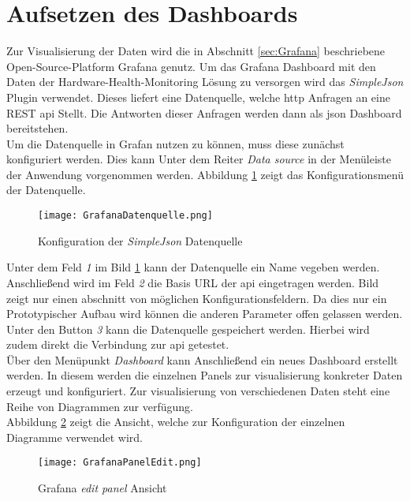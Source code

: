 \newpage
\section{Aufsetzen des Dashboards}
Zur Visualisierung der Daten wird die in Abschnitt \ref{sec:Grafana} beschriebene Open-Source-Platform Grafana genutz. Um das Grafana Dashboard mit den Daten der Hardware-Health-Monitoring Lösung zu versorgen wird das \textit{SimpleJson} Plugin verwendet. Dieses liefert eine Datenquelle, welche \ac{http} Anfragen an eine REST \ac{api} Stellt. Die Antworten dieser Anfragen werden dann als \ac{json} Dashboard bereitstehen.\\
Um die Datenquelle in Grafan nutzen zu können, muss diese zunächst konfiguriert werden. Dies kann Unter dem Reiter \textit{Data source} in der Menüleiste der Anwendung vorgenommen werden. Abbildung \ref{fig:SimpleJSONKonfig} zeigt das Konfigurationsmenü der Datenquelle. 
\begin{center}
    \begin{figure}[h!]
        \centering
        \texttt{[image: GrafanaDatenquelle.png]}
        \caption{Konfiguration der \textit{SimpleJson} Datenquelle}
        \label{fig:SimpleJSONKonfig}
    \end{figure}
\end{center}
Unter dem Feld \textit{1} im Bild \ref{fig:SimpleJSONKonfig} kann der Datenquelle ein Name vegeben werden. Anschließend wird im Feld \textit{2} die Basis URL der \ac{api} eingetragen werden. Bild zeigt nur einen abschnitt von möglichen Konfigurationsfeldern. Da dies nur ein Prototypischer Aufbau wird können die anderen Parameter offen gelassen werden. Unter den Button \textit{3} kann die Datenquelle gespeichert werden. Hierbei wird zudem direkt die Verbindung zur \ac{api} getestet.\\
Über den Menüpunkt \textit{Dashboard} kann Anschließend ein neues Dashboard erstellt werden. In diesem werden die einzelnen Panels zur visualisierung konkreter Daten erzeugt und konfiguriert. Zur visualisierung von verschiedenen Daten steht eine Reihe von Diagrammen zur verfügung.\\
Abbildung \ref{fig:PanelBearbeitung} zeigt die Ansicht, welche zur Konfiguration der einzelnen Diagramme verwendet wird.
\begin{center}
    \begin{figure}[h!]
        \centering
        \texttt{[image: GrafanaPanelEdit.png]}
        \caption{Grafana \textit{edit panel} Ansicht}
        \label{fig:PanelBearbeitung}
    \end{figure}
\end{center}
